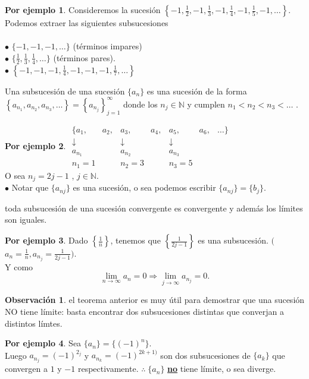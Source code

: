 \documentclass{article}
\theoremstyle{definition}
\theoremstyle{definition}
\newtheorem*{obs}{Observación}
\newtheorem*{ej}{Por ejemplo}
\theoremstyle{remark}
\begin{document}
\begin{ej}
  Consideremos la sucesión $\left\{-1,\frac{1}{2},-1,\frac{1}{3},-1,\frac{1}{4},-1,\frac{1}{5},-1,\dots\right\}$. Podemos extraer las siguientes subsucesiones \\ \\
  $\bullet$ $\{-1,-1,-1,\dots\}$  \quad (términos impares) \\
  $\bullet$ $\{\frac{1}{2},\frac{1}{3},\frac{1}{4},\dots\}$  \quad \quad \; \;(términos pares). \\
  $\bullet$ $\left\{-1,-1,-1,\frac{1}{4},-1,-1,-1,\frac{1}{7},\dots\right\}$

\end{ej}
\begin{defi}
  Una subsucesión de una sucesión $\{a_n\}$ es una sucesión de la forma $\left\{a_{n_1},a_{n_2},a_{n_3},\dots \right\} =\left\{a_{n_j}\right\}_{j=1}^{\infty}$ donde los $n_j \in \mathbb{N}$ y cumplen $n_1 < n_2 < n_3 < \dots$ . 
\end{defi}
\begin{ej}

$\begin{matrix*}
  \{a_1, & a_2, & a_3, & a_4, & a_5, & a_6, & \dots \} \\ 
  \downarrow & & \downarrow & & \downarrow & & \\
  a_{n_1} & & a_{n_2} & & a_{n_3} & & \\
  n_1=1 & & n_2=3 & & n_3=5
\end{matrix*}$ \\

O sea $n_j=2j-1 $ , $j \in \mathbb{N}$. \\

$\bullet$ \; Notar que $\{a_{nj}\}$ es una sucesión, o sea podemos escribir $\{a_{nj}\}=\{b_j\}$.

\end{ej} 
\begin{teo}
  toda subsucesión de una sucesión convergente es convergente y además los límites son iguales.
\end{teo}
\begin{ej}
  Dado $\left\{\frac{1}{n}\right\}$, tenemos que $\left\{\frac{1}{2j-1}\right\}$ es una subsucesión. $\big($  \\  $a_n=\frac{1}{n}, a_{n_j}=\frac{1}{2j-1}\big).$ \\ 
  Y como \[\lim_{n \to \infty}{a_n}=0 \Rightarrow \lim_{j \to \infty}{a_{n_j}}=0. \]
\end{ej}
\begin{obs}
  el teorema anterior es muy útil para demostrar que una sucesión NO tiene límite: basta encontrar dos subsucesiones distintas que converjan a distintos límtes.
\end{obs}
\begin{ej}
  Sea $\{a_n\}=\{(-1)^n\}$. \\
  Luego $a_{n_j}=(-1)^{2_j}$ y $a_{n_k}=(-1)^{2k+1)}$ son dos subsucesiones de $\{a_k\}$ que convergen a $1$ y $-1$ respectivamente. $\therefore \; \{a_n\}$ \textbf{\underline{no}} tiene límite, o sea diverge.
\end{ej}
\end{document}
